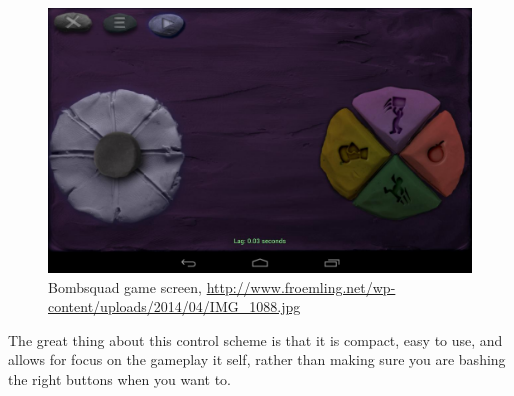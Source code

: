 \begin{figure}[H]
\centering
\includegraphics[width=1\textwidth]{figures/controlscheme/onscreen_control}
\caption{Bombsquad game screen, \url{http://www.froemling.net/wp-content/uploads/2014/04/IMG_1088.jpg}}
\end{figure}

The great thing about this control scheme is that it is compact, easy to use, and allows for focus on the gameplay it self, rather than making sure you are bashing the right buttons when you want to.

